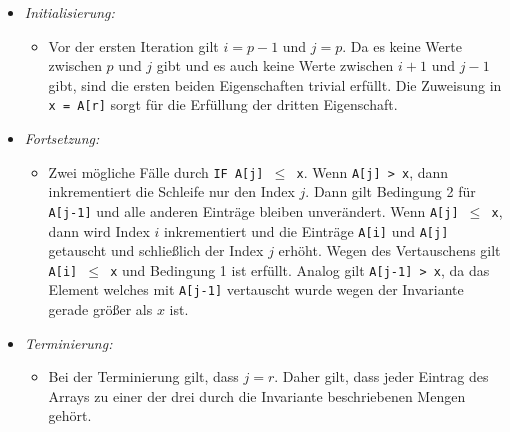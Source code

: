 \begin{itemize}
\begin{itemize}
                \item \textit{Initialisierung:}
                    \begin{itemize}
                        \item[]
                            Vor der ersten Iteration gilt $i = p - 1$ und $j = p$. Da es keine Werte zwischen $p$ und $j$
                            gibt und es auch keine Werte zwischen $i + 1$ und $j - 1$ gibt, sind die ersten beiden Eigenschaften
                            trivial erfüllt. Die Zuweisung in \texttt{x = A[r]} sorgt für die Erfüllung der dritten Eigenschaft.
                    \end{itemize}
                
                \item \textit{Fortsetzung:}
                    \begin{itemize}
                        \item[]
                            Zwei mögliche Fälle durch \texttt{IF A[j] $\leq$ x}. Wenn \texttt{A[j] > x}, dann inkrementiert die 
                            Schleife nur den Index $j$. Dann gilt Bedingung 2 für \texttt{A[j-1]} und alle anderen Einträge
                            bleiben unverändert. Wenn \texttt{A[j] $\leq$ x}, dann wird Index $i$ inkrementiert und die 
                            Einträge \texttt{A[i]} und \texttt{A[j]} getauscht und schließlich der Index $j$ erhöht. Wegen
                            des Vertauschens gilt \texttt{A[i] $\leq$ x} und Bedingung 1 ist erfüllt. Analog gilt
                            \texttt{A[j-1] > x}, da das Element welches mit \texttt{A[j-1]} vertauscht wurde wegen der 
                            Invariante gerade größer als $x$ ist.
                    \end{itemize}

                \item \textit{Terminierung:}
                    \begin{itemize}
                        \item[]
                            Bei der Terminierung gilt, dass $j = r$. Daher gilt, dass jeder Eintrag des Arrays zu einer der drei 
                            durch die Invariante beschriebenen Mengen gehört.
                    \end{itemize}
            \end{itemize}


\end{itemize}
